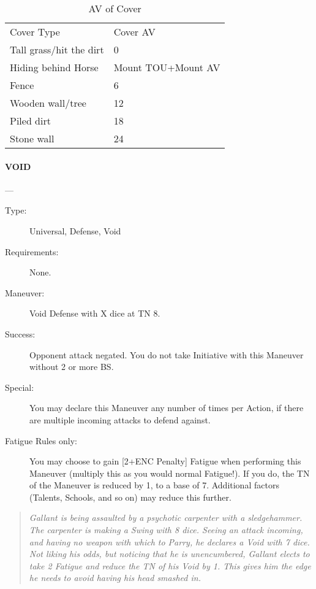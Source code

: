 \documentclass[oneside,11pt,english]{book}
\begin{document}
\begin{table}[!ht]
	\centering
	\caption{AV of Cover}
	\label{tab:Cover AV}
	\begin{tabu} spread 0pt{XX}
Cover Type& Cover AV\\
Tall grass/hit the dirt& 0\\
Hiding behind Horse& Mount TOU+Mount AV\\
Fence& 6\\
Wooden wall/tree& 12\\
Piled dirt& 18\\
Stone wall& 24\\
	\end{tabu}
\end{table}

\paragraph{\large\label{man:VOID} VOID}---
\vspace{-10pt}\begin{description} 
\item [Type:] Universal, Defense, Void 
\item [Requirements:] None. 
\item [Maneuver:] Void Defense with X dice at TN 8. 
\item [Success:] Opponent attack negated. You do not take Initiative with this Maneuver without 2 or more BS. 
\item [Special:] You may declare this Maneuver any number of times per Action, if there are multiple incoming 
attacks to defend against. 
\item [Fatigue Rules only:] You may choose to gain [2+ENC Penalty] Fatigue when performing this Maneuver 
(multiply this as you would normal Fatigue!). If you do, the TN of the Maneuver is reduced by 1, to a 
base of 7. Additional factors (Talents, Schools, and so on) may reduce this further. 
\end{description}
\begin{quotation}
\emph{Gallant is being assaulted by a psychotic carpenter with a sledgehammer. The carpenter is making a Swing with 8 dice. Seeing 
an attack incoming, and having no weapon with which to Parry, he declares a Void with 7 dice. Not liking his odds, but noticing 
that he is unencumbered, Gallant elects to take 2 Fatigue and reduce the TN of his Void by 1. This gives him the edge he needs to 
avoid having his head smashed in.}
\end{quotation}
\end{document}
